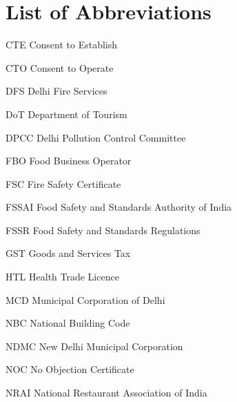 \documentclass[a4paper, 12pt]{article}
\begin{document}
                   \section*{List of Abbreviations}
                  
       
        
        \begin{abbrv}        
        
 		\item[CTE]		Consent to Establish
 		\item[CTO]		Consent to Operate
 		\item[DFS]		Delhi Fire Services
 		\item[DoT]			Department of Tourism
 		\item[DPCC]		Delhi Pollution Control Committee
 		\item[FBO]		Food Business Operator
 		\item[FSC]		Fire Safety Certificate
		\item[FSSAI]		Food Safety and Standards Authority of India 
 		\item[FSSR]		Food Safety and Standards Regulations
 		\item[GST]		Goods and Services Tax
 		\item[HTL]			Health Trade Licence
 		\item[MCD]		Municipal Corporation of Delhi
 		\item[NBC]		National Building Code
 		\item[NDMC]		New Delhi Municipal Corporation
 		\item[NOC	]		No Objection Certificate
 		\item[NRAI]		National Restaurant Association of India  
        \end{abbrv}
        
        
		
\end{document}
